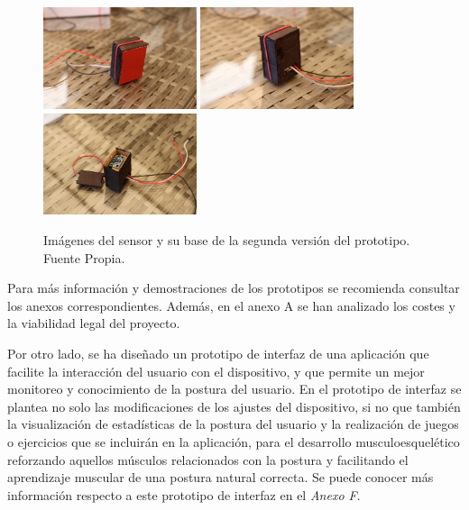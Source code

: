 \begin{figure}[h!]
    \centering
    \includegraphics[width=0.4\textwidth]{img/SensorV2_1.jpg}
    \includegraphics[width=0.4\textwidth]{img/SensorV2_2.jpg}
    \includegraphics[width=0.4\textwidth]{img/SensorV2_3.jpg}
    \caption{Imágenes del sensor y su base de la segunda versión del prototipo. Fuente Propia.}
    \label{fig:imgDispositivo_V2_sensor} 
\end{figure}

Para más información y demostraciones de los prototipos se recomienda consultar los anexos correspondientes. Además, en el anexo A se han analizado los costes y la viabilidad legal del proyecto.

Por otro lado, se ha diseñado un prototipo de interfaz de una aplicación que facilite la interacción del usuario con el dispositivo, y que permite un mejor monitoreo y conocimiento de la postura del usuario. En el prototipo de interfaz se plantea no solo las modificaciones de los ajustes del dispositivo, si no que también la visualización de estadísticas de la postura del usuario y la realización de juegos o ejercicios que se incluirán en la aplicación, para el desarrollo musculoesquelético reforzando aquellos músculos relacionados con la postura y facilitando el aprendizaje muscular de una postura natural correcta. Se puede conocer más información respecto a este prototipo de interfaz en el \textit{Anexo F}.



